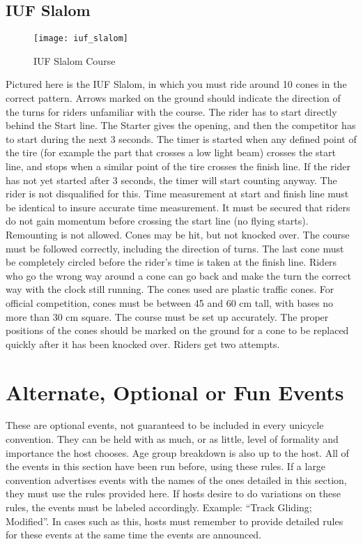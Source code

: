 \subsection{IUF Slalom}
\begin{figure}[h]
\begin{center}
\texttt{[image: iuf\_slalom]}
\end{center}
\vspace{-20pt}
\caption{IUF Slalom Course \label{fig:iuf_slalom}}
\vspace{-10pt}
\end{figure}
Pictured here is the IUF Slalom, in which you must ride around 10 cones in the correct pattern.
Arrows marked on the ground should indicate the direction of the turns for riders unfamiliar with the course.
The rider has to start directly behind the Start line.
The Starter gives the opening, and then the competitor has to start during the next 3 seconds.
The timer is started when any defined point of the tire (for example the part that crosses a low light beam) crosses the start line, and stops when a similar point of the tire crosses the finish line.
If the rider has not yet started after 3 seconds, the timer will start counting anyway.
The rider is not disqualified for this.
Time measurement at start and finish line must be identical to insure accurate time measurement.
It must be secured that riders do not gain momentum before crossing the start line (no flying starts).
Remounting is not allowed. 
Cones may be hit, but not knocked over.
The course must be followed correctly, including the direction of turns.
The last cone must be completely circled before the rider's time is taken at the finish line.
Riders who go the wrong way around a cone can go back and make the turn the correct way with the clock still running.
The cones used are plastic traffic cones.
For official competition, cones must be between 45 and 60 cm tall, with bases no more than 30 cm square.
The course must be set up accurately.
The proper positions of the cones should be marked on the ground for a cone to be replaced quickly after it has been knocked over.
Riders get two attempts.

\section{Alternate, Optional or Fun Events \label{sec:track-field_alternate-optional-fun-events}}
These are optional events, not guaranteed to be included in every unicycle convention.
They can be held with as much, or as little, level of formality and importance the host chooses.
Age group breakdown is also up to the host.
All of the events in this section have been run before, using these rules.
If a large convention advertises events with the names of the ones detailed in this section, they must use the rules provided here.
If hosts desire to do variations on these rules, the events must be labeled accordingly.
Example: ``Track Gliding; Modified''.
In cases such as this, hosts must remember to provide detailed rules for these events at the same time the events are announced.

